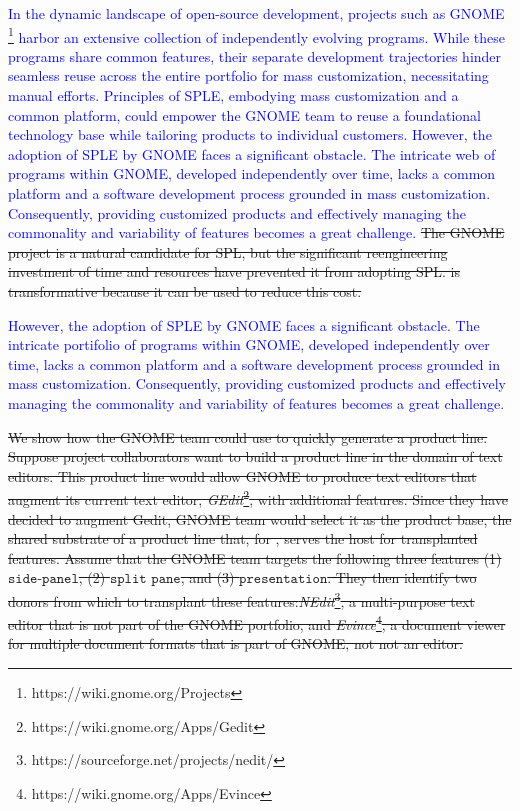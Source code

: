 \textcolor{blue}{In the dynamic landscape of open-source development, projects such as GNOME \footnote{https://wiki.gnome.org/Projects} harbor an extensive collection of independently evolving programs. While these programs share common features, their separate development trajectories hinder seamless reuse across the entire portfolio for mass customization, necessitating manual efforts. Principles of SPLE\cite{Pohl2005}, embodying mass customization and a common platform, could empower the GNOME team to reuse a foundational technology base while tailoring products to individual customers. However, the adoption of SPLE by GNOME faces a significant obstacle. The intricate web of programs within GNOME, developed independently over time, lacks a common platform and a software development process grounded in mass customization. Consequently, providing customized products and effectively managing the commonality and variability of features becomes a great challenge.}
\sout{The GNOME  project is a natural candidate for SPL, but the significant reengineering investment of time and resources have prevented it from adopting SPL. \FOUNDRY is transformative because it can be used to reduce this cost.}

\textcolor{blue}{However, the adoption of SPLE by GNOME faces a significant obstacle. The intricate portifolio of programs within GNOME, developed independently over time, lacks a common platform and a software development process grounded in mass customization. Consequently, providing customized products and effectively managing the commonality and variability of features becomes a great challenge.}

\sout{We show how the GNOME team could use \prodscalpel to quickly generate a product line. Suppose project collaborators want to build a product line in the domain of text editors. This product line would allow GNOME to produce text editors that augment its current text editor, \emph{GEdit}\footnote{https://wiki.gnome.org/Apps/Gedit}, with additional features. Since they have decided to augment Gedit, GNOME team would select it as the product base, the shared substrate of a product line that, for \FOUNDRY, serves the host for transplanted features. Assume that the GNOME team targets the following three features (1) $\texttt{side-panel}$, (2) $\texttt{split pane}$, and (3) $\texttt{presentation}$. They then identify two donors from which to transplant these features:\emph{NEdit}\footnote{https://sourceforge.net/projects/nedit/}, a multi-purpose text editor that is not part of the GNOME portfolio, and \emph{Evince}\footnote{https://wiki.gnome.org/Apps/Evince}, a document viewer for multiple document formats that is part of GNOME, not not an editor. }

